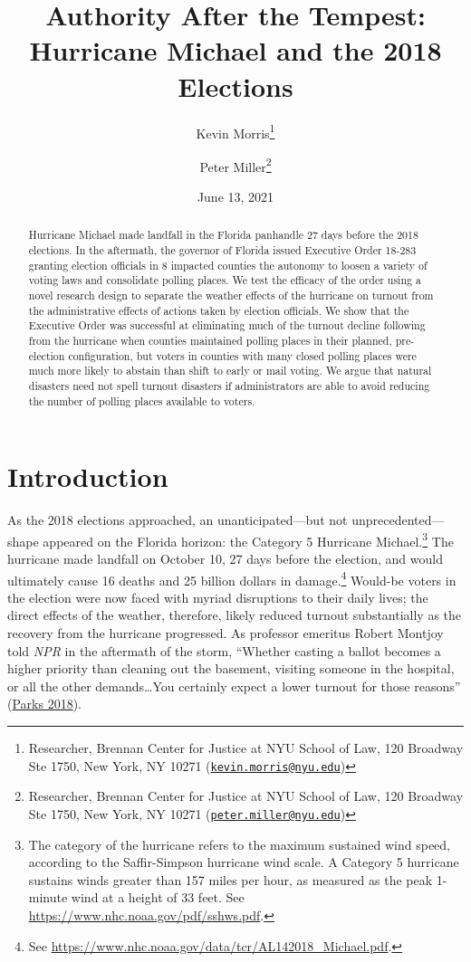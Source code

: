 \documentclass[
  12pt,
]{article}
\title{Authority After the Tempest: Hurricane Michael and the 2018 Elections}
\author{Kevin Morris\footnote{Researcher, Brennan Center for Justice at NYU School of Law, 120 Broadway Ste 1750, New York, NY 10271 (\href{mailto:kevin.morris@nyu.edu}{\nolinkurl{kevin.morris@nyu.edu}})} \and Peter Miller\footnote{Researcher, Brennan Center for Justice at NYU School of Law, 120 Broadway Ste 1750, New York, NY 10271 (\href{mailto:peter.miller@nyu.edu}{\nolinkurl{peter.miller@nyu.edu}})}}
\date{June 13, 2021}
\begin{document}
\maketitle
\begin{abstract}
Hurricane Michael made landfall in the Florida panhandle 27 days before the 2018 elections. In the aftermath, the governor of Florida issued Executive Order 18-283 granting election officials in 8 impacted counties the autonomy to loosen a variety of voting laws and consolidate polling places. We test the efficacy of the order using a novel research design to separate the weather effects of the hurricane on turnout from the administrative effects of actions taken by election officials. We show that the Executive Order was successful at eliminating much of the turnout decline following from the hurricane when counties maintained polling places in their planned, pre-election configuration, but voters in counties with many closed polling places were much more likely to abstain than shift to early or mail voting. We argue that natural disasters need not spell turnout disasters if administrators are able to avoid reducing the number of polling places available to voters.
\end{abstract}

\pagebreak

\doublespacing

\hypertarget{introduction}{%
\section*{Introduction}\label{introduction}}

As the 2018 elections approached, an unanticipated---but not unprecedented---shape appeared on the Florida horizon: the Category 5 Hurricane Michael.\footnote{The category of the hurricane refers to the maximum sustained wind speed, according to the Saffir-Simpson hurricane wind scale. A Category 5 hurricane sustains winds greater than 157 miles per hour, as measured as the peak 1-minute wind at a height of 33 feet. See \url{https://www.nhc.noaa.gov/pdf/sshws.pdf}.} The hurricane made landfall on October 10, 27 days before the election, and would ultimately cause 16 deaths and 25 billion dollars in damage.\footnote{See \url{https://www.nhc.noaa.gov/data/tcr/AL142018_Michael.pdf}.} Would-be voters in the election were now faced with myriad disruptions to their daily lives; the direct effects of the weather, therefore, likely reduced turnout substantially as the recovery from the hurricane progressed. As professor emeritus Robert Montjoy told \emph{NPR} in the aftermath of the storm, ``Whether casting a ballot becomes a higher priority than cleaning out the basement, visiting someone in the hospital, or all the other demands\ldots You certainly expect a lower turnout for those reasons'' (\protect\hyperlink{ref-Parks2018}{Parks 2018}).
\end{document}
